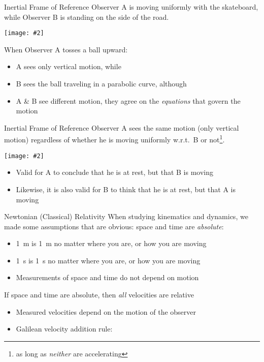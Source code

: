 \documentclass[12pt,compress,aspectratio=169]{beamer}
\newcommand{\mb}[1]{\mathbf{#1}}
\newcommand{\pic}[2]{\texttt{[image: \#2]}}
\newcommand{\eq}[2]{\vspace{#1}{\Large\begin{displaymath}#2\end{displaymath}}}
\begin{document}
\begin{frame}{Inertial Frame of Reference}
  Observer A is moving uniformly with the skateboard, while Observer B is
  standing on the side of the road.
  \begin{center}
    \pic{.65}{graphics/57.jpg}
  \end{center}
  When Observer A tosses a ball upward:
  \begin{itemize}
  \item A sees only vertical motion, while
  \item B sees the ball traveling in a parabolic curve, although
  \item A \& B see different motion, they agree on the \emph{equations} that
    govern the motion
  \end{itemize}
\end{frame}



\begin{frame}{Inertial Frame of Reference}
  Observer A sees the same motion (only vertical motion) regardless of
  whether he is moving uniformly w.r.t.\ B or not\footnote{as long as
    \emph{neither} are accelerating}.
  \begin{center}
    \pic{.65}{graphics/57.jpg}
  \end{center}
  \begin{itemize}
  \item Valid for A to conclude that he is at rest, but that B is moving
  \item Likewise, it is also valid for B to think that he is at rest, but that
    A is moving
  \end{itemize}
\end{frame}
    

\begin{frame}{Newtonian (Classical) Relativity}
  When studying kinematics and dynamics, we made some assumptions that are
  obvious: space and time are \emph{absolute}:
  \begin{itemize}
  \item \SI{1}{m} is \SI{1}{m} no matter where you are, or how you are moving
  \item \SI{1}{s} is \SI{1}{s} no matter where you are, or how you are moving
  \item Measurements of space and time do not depend on motion
  \end{itemize}
  If space and time are absolute, then \emph{all} velocities are relative
  \begin{itemize}
  \item Measured velocities depend on the motion of the observer
  \item Galilean velocity addition rule:

    \eq{-.25in}{
      \boxed{\mb{v}_{AC}=\mb{v}_{AB}+\mb{v}_{BC}}
    }
  \end{itemize}
\end{frame}
\end{document}
